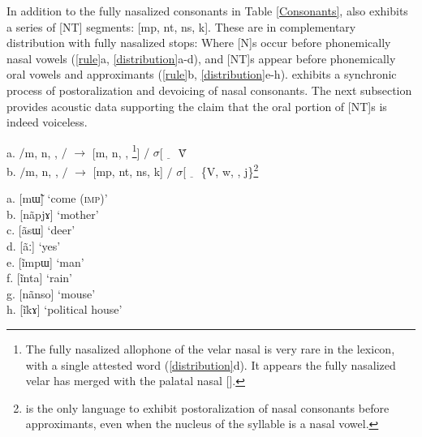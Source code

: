 \documentclass[output=paper,hidelinks]{langscibook}
\begin{document}
In addition to the fully nasalized consonants in Table \ref{Consonants},  also exhibits a series of [NT] segments: [mp, nt, ns, {\NG}k]. These are in complementary distribution with fully nasalized stops: Where [N]s occur before phonemically nasal vowels (\ref{rule}a, \ref{distribution}a-d), and [NT]s appear before phonemically oral vowels and approximants (\ref{rule}b, \ref{distribution}e-h).  exhibits a synchronic process of postoralization and devoicing of nasal consonants. The next subsection provides acoustic data supporting the claim that the oral portion of [NT]s is indeed voiceless.

\ea\label{rule} a. $/$m, n, \textltailn, {\NG}$/$ $\rightarrow$ [m, n, \textltailn, {\NG}\footnote{The fully nasalized allophone of the velar nasal is very rare in the  lexicon, with a single attested word (\ref{distribution}d). It appears the fully nasalized velar has merged with the palatal nasal [\textltailn].}] $/$ $\sigma$[$\underline{\hspace{1em}}$ \~V\\
b. $/$m, n, \textltailn, {\NG}$/$ $\rightarrow$ [mp, nt, ns, {\NG}k] $/$ $\sigma$[$\underline{\hspace{1em}}$ \{V, w, \textfishhookr, j\}\footnote{ is the only  language to exhibit postoralization of nasal consonants before approximants, even when the nucleus of the syllable is a nasal vowel.}
\z

\begin{multicols}{2}
\ea\label{distribution} a. [m\~ɯ{\NG}] \hspace{.7cm} `come (\textsc{imp})' \\
b. [n\~apjɤ] \hspace{.64cm} `mother' \\
c. [\textltailn\~asɯ] \hspace{.7cm} `deer' \\
d. [{\NG}\~aː] \hspace{1.05cm} `yes' \\
e. [\~impɯ] \hspace{.73cm} `man' \\
f. [\~inta] \hspace{1.1cm} `rain' \\
g. [n\~anso] \hspace{.7cm} `mouse' \\
h. [\~i{\NG}kɤ] \hspace{.9cm} `political house' \\
\z
\end{multicols}
\end{document}

